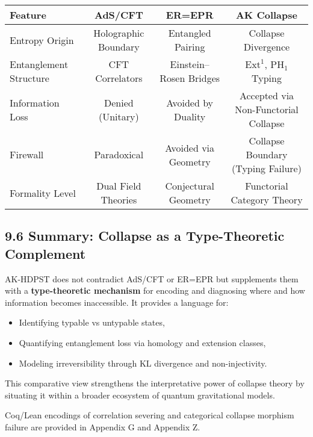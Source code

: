 \documentclass[11pt]{article}
\begin{document}
\begin{center}
\small
\begin{tabular}{lccc}
\toprule
\textbf{Feature} & \textbf{AdS/CFT} & \textbf{ER=EPR} & \textbf{AK Collapse} \\
\midrule
Entropy Origin & Holographic Boundary & Entangled Pairing & Collapse Divergence \\
Entanglement Structure & CFT Correlators & Einstein--Rosen Bridges & $\mathrm{Ext}^1$, $\mathrm{PH}_1$ Typing \\
Information Loss & Denied (Unitary) & Avoided by Duality & Accepted via Non-Functorial Collapse \\
Firewall & Paradoxical & Avoided via Geometry & Collapse Boundary (Typing Failure) \\
Formality Level & Dual Field Theories & Conjectural Geometry & Functorial Category Theory \\
\bottomrule
\end{tabular}
\end{center}


\subsection*{9.6 Summary: Collapse as a Type-Theoretic Complement}

AK-HDPST does not contradict AdS/CFT or ER=EPR but supplements them with a \textbf{type-theoretic mechanism} for encoding and diagnosing where and how information becomes inaccessible. It provides a language for:

\begin{itemize}
    \item Identifying typable vs untypable states,
    \item Quantifying entanglement loss via homology and extension classes,
    \item Modeling irreversibility through KL divergence and non-injectivity.
\end{itemize}

This comparative view strengthens the interpretative power of collapse theory by situating it within a broader ecosystem of quantum gravitational models.

Coq/Lean encodings of correlation severing and categorical collapse morphism failure are provided in Appendix G and Appendix Z.



\end{document}
